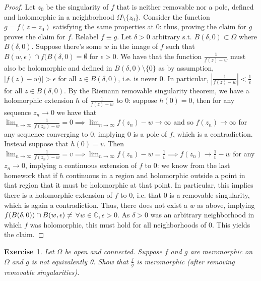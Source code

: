 \documentclass{article}
\newcommand{\bb}[1]{\mathbb{#1}}
\newtheorem{exercise}{Exercise}
\begin{document}
\begin{proof}
  Let $z_{0}$ be the singularity of $f$ that is neither removable nor a pole, defined and holomorphic in a neighborhood $\Omega \setminus \{z_{0}\}$. Consider the function $g = f(z + z_{0})$ satisfying the same properties at $0$: thus, proving the claim for $g$ proves the claim for $f$. Relabel $f \equiv g$.  Let $\delta>0$ arbitrary s.t. $B(\delta,0)\subset \Omega$ where $B(\delta,0)$. Suppose there's some $w$ in the image of $f$ such that $B(w,\epsilon) \cap f(B(\delta, 0) = \emptyset$ for $\epsilon > 0$. We have that the function $\frac{1}{f(z) - w}$ must also be holomorphic and defined in $B(\delta,0) \setminus \{0\}$ as by assumption, $|f(z) - w)| > \epsilon$ for all $z \in B(\delta, 0)$, i.e. is never $0$. In particular, $|\frac{1}{f(z) - w}| < \frac{1}{\epsilon}$ for all $z \in B(\delta, 0)$. By the Riemann removable singularity theorem, we have a holomorphic extension $h$ of $\frac{1}{f(z) - w}$ to $0$: suppose $h(0) = 0$, then for any sequence $z_{n} \to 0$ we have that $\lim_{n \to \infty}\frac{1}{f(z_{n}) - w} = 0 \implies \lim_{n \to \infty} f(z_{n}) - w \to \infty$ and so $f(z_{n}) \to \infty$ for any sequence converging to $0$, implying $0$ is a pole of $f$, which is a contradiction. Instead suppose that $h(0) = v$. Then $\lim_{n \to \infty}\frac{1}{f(z_{n}) - w} = v \implies \lim_{n \to \infty} f(z_{n}) - w = \frac{1}{v} \implies f(z_{n}) \to \frac{1}{v} - w$ for any $z_{n} \to 0$, implying a continuous extension of $f$ to $0$: we know from the last homework that if $h$ continuous in a region and holomorphic outside a point in that region that it must be holomorphic at that point. In particular, this implies there is a holomorphic extension of $f$ to $0$, i.e. that $0$ is a removable singularity, which is again a contradiction. Thus, there does not exist a $w$ as above, implying $f(B(\delta,0)) \cap B(w,\epsilon) \neq \empty$ $\forall w \in \bb{C}, \epsilon > 0$. As $\delta> 0$ was an arbitrary neighborhood in which $f$ was holomorphic, this must hold for all neighborhoods of $0$. This yields the claim. 
\end{proof}
\newpage
\begin{exercise}
  Let $\Omega$ be open and connected. Suppose $f$ and $g$ are meromorphic on $\Omega$ and $g$ is not equivalently 0. Show that $\frac{f}{g}$ is meromorphic (after removing removable singularities). 
\end{exercise}
\end{document}
